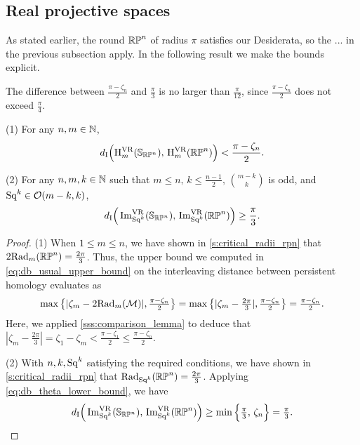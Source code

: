 \subsection{Real projective spaces}\label{ss:distance_estimate_rpn}

As stated earlier, the round \(\mathbb{RP}^n\) of radius \(\pi\) satisfies our Desiderata, so the ... in the previous subsection apply.
In the following result we make the bounds explicit.


The difference between $\frac{\pi - \zeta_n}{2}$ and $\frac{\pi}{3}$ is no larger than $\frac{\pi}{12}$, since \(\tfrac{\pi - \zeta_n}{2}\) does not exceed \(\tfrac{\pi}{4}\).

\medskip\theorem
(1) For any \(n,m \in \mathbb{N}\),
\[
d_{\mathrm{I}}\Big(\mathrm{H}^{\mathrm{VR}}_m(\mathbb{S}_{\mathbb{RP}^n}),\, \mathrm{H}^{\mathrm{VR}}_m(\mathbb{RP}^n)\Big) < \frac{\pi - \zeta_n}{2}.
\]

\noindent (2) For any \(n,m,k \in \mathbb{N}\) such that $m \leq n,\, k \leq \tfrac{n-1}{2},\, \binom{m-k}{k}$ is odd, and $\mathrm{Sq}^k\in \mathcal{O}(m-k, k)$,
\[
d_{\mathrm{I}}\Big(\operatorname{Im}_{\mathrm{Sq}^k}^{\mathrm{VR}}(\mathbb{S}_{\mathbb{RP}^n}),\, \operatorname{Im}_{\mathrm{Sq}^k}^{\mathrm{VR}}(\mathbb{RP}^n)\Big) \geq \frac{\pi}{3}.
\]

\begin{proof}
    (1) %
    When $1 \leq m \leq n$, we have shown in \cref{s:critical_radii_rpn} that
    $2\mathrm{Rad}_{m}(\mathbb{RP}^n) = \tfrac{2\pi}{3}$.
    Thus, the upper bound we computed in \cref{eq:db_usual_upper_bound} on the interleaving distance between persistent homology evaluates as
    \[\max\big\{|\zeta_m  - 2\mathrm{Rad}_{m}(\mathcal{M}) |, \tfrac{\pi - \zeta_n}{2}\big\} =
    \max \big\{ |\zeta_m  - \tfrac{2\pi}{3} |, \tfrac{\pi - \zeta_n}{2} \big\}
    = \tfrac{\pi - \zeta_n}{2}.
    \]
    Here, we applied \cref{sss:comparison_lemma} to deduce that $|\zeta_m  - \tfrac{2\pi}{3} | = \zeta_1 - \zeta_m < \tfrac{\pi - \zeta_1}{2} \leq \tfrac{\pi - \zeta_n}{2}$.
 
    (2) With $n,k,\mathrm{Sq}^k$ satisfying the required conditions, we have shown in \cref{s:critical_radii_rpn} that
	$\mathrm{Rad}_{\mathrm{Sq}^k}(\mathbb{RP}^n) = \tfrac{2\pi}{3}$.
    Applying \cref{eq:db_theta_lower_bound}, we have
	\[d_{\mathrm{I}}\Big(\operatorname{Im}_{\mathrm{Sq}^k}^{\mathrm{VR}}(\mathbb{S}_{\mathbb{RP}^n}),\, \operatorname{Im}_{\mathrm{Sq}^k}^{\mathrm{VR}}(\mathbb{RP}^n)\Big)
	\geq \min\Big\{\tfrac{\pi}{3},\, \zeta_n\Big\}
	= \tfrac{\pi}{3}.\qedhere
    \]
\end{proof}